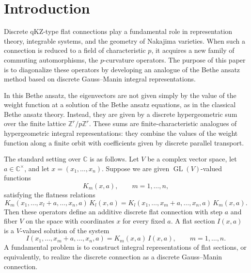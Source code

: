 \documentclass[12pt]{amsart}
\theoremstyle{definition} %
\numberwithin{equation}{section}
\theoremstyle{definition}
\let\on\operatorname
\def\C{{\mathbb C}}
\def\Z{{\mathbb Z}}
\begin{document}
{\small\tableofcontents\par}

\setcounter{footnote}{0}
\renewcommand{\thefootnote}{\arabic{footnote}}

\section{Introduction}
\label{sec 1}

Discrete qKZ-type flat connections play a fundamental role in representation theory, integrable systems, and the geometry of Nakajima varieties. When such a connection is reduced to a field of characteristic $p$, it acquires a new family of commuting automorphisms, the $p$-curvature operators.
The purpose of this paper is to diagonalize these operators 
by developing an analogue of the Bethe ansatz 
method based on discrete Gauss--Manin integral representations.

In this Bethe ansatz, the eigenvectors are not given simply by the value of the weight
function at a solution of the Bethe ansatz equations, as in the classical Bethe ansatz theory. Instead, they are
given by a discrete hypergeometric sum over the finite lattice
$\Z^r/p\Z^r$.
These sums are finite-characteristic analogues of hypergeometric integral representations:
they combine the values of the weight function along a finite orbit with coefficients
given by discrete parallel transport.


\smallskip
The  standard setting over $\C$ 
 is as follows. Let $V$ be a complex vector space, let $a \in \mathbb{C}^\times$, and let $x=(x_1,\dots,x_n)$. Suppose we are given $\on{GL}(V)$-valued functions
\[
K_m(x,a), \qquad m=1,\dots,n,
\]
satisfying the flatness relations
\begin{equation}
\label{flatness}
K_m(x_1,\dots,x_l+a,\dots,x_n,a)\,K_l(x,a)
=
K_l(x_1,\dots,x_m+a,\dots,x_n,a)\,K_m(x,a).
\end{equation}
Then these operators define an additive discrete flat connection with step $a$ and fiber $V$ on the space with coordinates $x$ for every fixed $a$. A flat section $I(x,a)$ is a $V$-valued solution of the system
\begin{equation}
I(x_1,\dots,x_m+a,\dots,x_n,a)=K_m(x,a)\,I(x,a), \qquad m=1,\dots,n.
 \label{qqKZ}
\end{equation}
A fundamental problem is to construct integral representations of flat sections, or equivalently, to realize the discrete connection as a discrete Gauss--Manin connection.
\end{document}
